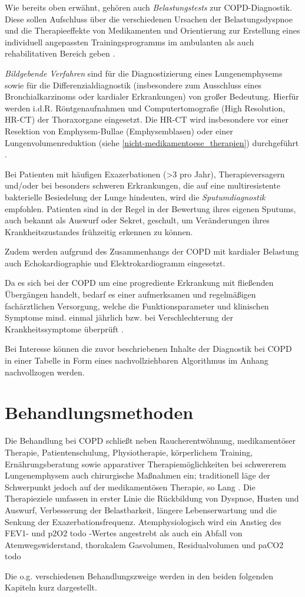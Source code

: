 Wie bereits oben erwähnt, gehören auch \emph{Belastungstests} zur COPD-Diagnostik. Diese sollen Aufschluss über die verschiedenen Ursachen der Belastungsdyspnoe und die Therapieeffekte von Medikamenten und Orientierung zur Erstellung eines individuell angepassten Trainingsprogramms im ambulanten als auch rehabilitativen Bereich geben \autocite[vgl.][e7]{vogelmeier2007}. 

\emph{Bildgebende Verfahren} sind für die Diagnostizierung eines Lungenemphysems sowie für die Differenzialdiagnostik (insbesondere zum Ausschluss eines Bronchialkarzinoms oder kardialer Erkrankungen) von großer Bedeutung. Hierfür werden i.d.R. Röntgenaufnahmen und Computertomografie (High Resolution, HR-CT) der Thoraxorgane eingesetzt. Die HR-CT wird insbesondere vor einer Resektion von Emphysem-Bullae (Emphysemblasen) oder einer Lungenvolumenreduktion (siehe \ref{nicht-medikamentoese_therapien}) durchgeführt \autocite[191]{welte2007}.

Bei Patienten mit häufigen Exazerbationen (>3 pro Jahr), Therapieversagern und/oder bei besonders schweren Erkrankungen, die auf eine multiresistente bakterielle Besiedelung der Lunge hindeuten, wird die \emph{Sputumdiagnostik} empfohlen. Patienten sind in der Regel in der Bewertung ihres eigenen Sputums, auch bekannt als Auswurf oder Sekret, geschult, um Veränderungen ihres Krankheitszustandes frühzeitig erkennen zu können. 

Zudem werden aufgrund des Zusammenhangs der COPD mit kardialer Belastung auch Echokardiographie und Elektrokardiogramm eingesetzt.

Da es sich bei der COPD um eine progrediente Erkrankung mit fließenden Übergängen handelt, bedarf es einer aufmerksamen und regelmäßigen fachärztlichen Versorgung, welche die Funktionsparameter und klinischen Symptome mind. einmal jährlich bzw. bei Verschlechterung der Krankheitssymptome überprüft \autocite[vgl.][e8ff.]{vogelmeier2007}.

Bei Interesse können die zuvor beschriebenen Inhalte der Diagnostik bei COPD in einer Tabelle in Form eines nachvollziehbaren Algorithmus im Anhang nachvollzogen werden.

\section{Behandlungsmethoden}
\label{behandlungsmethoden}
Die Behandlung bei COPD schließt neben Raucherentwöhnung, medikamentöser Therapie, Patientenschulung, Physiotherapie, körperlichem Training, Ernährungsberatung sowie apparativer Therapiemöglichkeiten bei schwererem Lungenemphysem auch chirurgische Maßnahmen ein; traditionell läge der Schwerpunkt jedoch auf der medikamentösen Therapie, so Lang \autocite[vgl.][287]{lang2007}. Die Therapieziele umfassen in erster Linie die Rückbildung von Dyspnoe, Husten und Auswurf, Verbesserung der Belastbarkeit, längere Lebenserwartung und die Senkung der Exazerbationsfrequenz. Atemphysiologisch wird ein Anstieg des FEV1- und p2O2 todo -Wertes angestrebt als auch ein Abfall von Atemwegswiderstand, thorakalem Gasvolumen, Residualvolumen und paCO2 todo \author[vgl.][158]{lorenz2009}
Die o.g. verschiedenen Behandlungszweige werden in den beiden folgenden Kapiteln kurz dargestellt.

